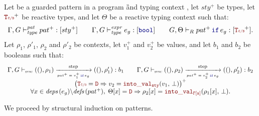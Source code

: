 \begin{skippableproof}
    Let  be a guarded pattern in a program \G and typing context \tyCtx, let
    $sty^+$ be types, let $\rType^+$ be reactive types, and let $\Theta$ be a reactive typing
    context such that:
    \begin{equation*}
        \patTyped{pat^+}{sty^+} \qquad \exprTyped{e_g}{\kwf{bool}} \qquad \patTypedReact{\Theta}{\guarded{pat^+}{e_g}}{\rType^+}.
    \end{equation*}
    Let $\rho_1$, $\rho'_1$, $\rho_2$ and $\rho'_2$ be contexts, let $v_1^+$ and $v_2^+$ be values,
    and let $b_1$ and $b_2$ be booleans such that:
    \begin{equation*}
        \begin{array}{c}
            \patOpsem{\rho_1}{\guarded{pat^+ = v_1^+}{e_g}}{b_1}{\rho'_1} \qquad \patOpsem{\rho_2}{\guarded{pat^+ = v_2^+}{e_g}}{b_2}{\rho'_2} \\
            \left(\rType = \dType \Rightarrow v_2 = \intoVal{sty}{v_1}{\bot}\right)^+                                                          \\
            \forall x \in \deps{e_g} \backslash \defs{pat^+}, \; \Theta[x] = \dType \Rightarrow \rho_2[x] = \intoVal{\tyCtx[x]}{\rho_1[x]}{\bot}.
        \end{array}
    \end{equation*}

    We proceed by structural induction on patterns.


\end{skippableproof}
